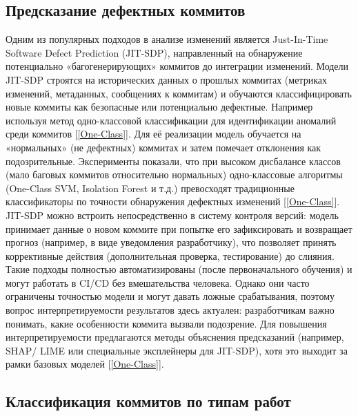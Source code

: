 \subsection{Предсказание дефектных коммитов}
Одним из популярных подходов в анализе изменений является Just-In-Time Software Defect Prediction (JIT-SDP), направленный на обнаружение потенциально «багогенерирующих» коммитов до интеграции изменений. Модели JIT-SDP строятся на исторических данных о прошлых коммитах (метриках изменений, метаданных, сообщениях к коммитам) и обучаются классифицировать новые коммиты как безопасные или потенциально дефектные. Например используя метод одно-классовой классификации для идентификации аномалий среди коммитов [\ref{One-Class}]. Для её реализации модель обучается на «нормальных» (не дефектных) коммитах и затем помечает отклонения как подозрительные. Эксперименты показали, что при высоком дисбалансе классов (мало баговых коммитов относительно нормальных) одно-классовые алгоритмы (One-Class SVM, Isolation Forest и т.д.) превосходят традиционные классификаторы по точности обнаружения дефектных изменений [\ref{One-Class}]. JIT-SDP можно встроить непосредственно в систему контроля версий: модель принимает данные о новом коммите при попытке его зафиксировать и возвращает прогноз (например, в виде уведомления разработчику), что позволяет принять коррективные действия (дополнительная проверка, тестирование) до слияния. Такие подходы полностью автоматизированы (после первоначального обучения) и могут работать в CI/CD без вмешательства человека. Однако они часто ограничены точностью модели и могут давать ложные срабатывания, поэтому вопрос интерпретируемости результатов здесь актуален: разработчикам важно понимать, какие особенности коммита вызвали подозрение. Для повышения интерпретируемости предлагаются методы объяснения предсказаний (например, SHAP/ LIME или специальные эксплейнеры для JIT-SDP), хотя это выходит за рамки базовых моделей [\ref{One-Class}]. 

\subsection{Классификация коммитов по типам работ}

